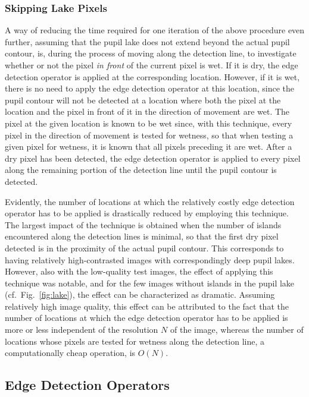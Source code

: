 \subsubsection{Skipping Lake Pixels}
\label{pg:skiplakepixels}

A way of reducing the time required for one iteration of the above
procedure even further, assuming that the pupil lake does not extend
beyond the actual pupil contour, is, during the process of moving
along the detection line, to investigate whether or not the pixel {\em
  in front\/} of the current pixel is wet.  If it is dry, the edge
detection operator is applied at the corresponding location.  However,
if it is wet, there is no need to apply the edge detection operator at
this location, since the pupil contour will not be detected at a
location where both the pixel at the location and the pixel in front
of it in the direction of movement are wet.  The pixel at the given
location is known to be wet since, with this technique, every pixel in
the direction of movement is tested for wetness, so that when testing
a given pixel for wetness, it is known that all pixels preceding it
are wet.  After a dry pixel has been detected, the edge detection
operator is applied to every pixel along the remaining portion of the
detection line until the pupil contour is detected.

Evidently, the number of locations at which the relatively costly edge
detection operator has to be applied is drastically reduced by
employing this technique.  The largest impact of the technique is
obtained when the number of islands encountered along the detection
lines is minimal, so that the first dry pixel detected is in the
proximity of the actual pupil contour.  This corresponds to having
relatively high-contrasted images with correspondingly deep pupil
lakes.  However, also with the low-quality test images, the effect of
applying this technique was notable, and for the few images without
islands in the pupil lake (cf.\ Fig.~\ref{fig:lake}), the effect can
be characterized as dramatic.  Assuming relatively high image quality,
this effect can be attributed to the fact that the number of locations
at which the edge detection operator has to be applied is more or less
independent of the resolution $N$ of the image, whereas the number of
locations whose pixels are tested for wetness along the detection
line, a computationally cheap operation, is $O(N)$.

\subsection{Edge Detection Operators}
\label{algo:pos:operators}

